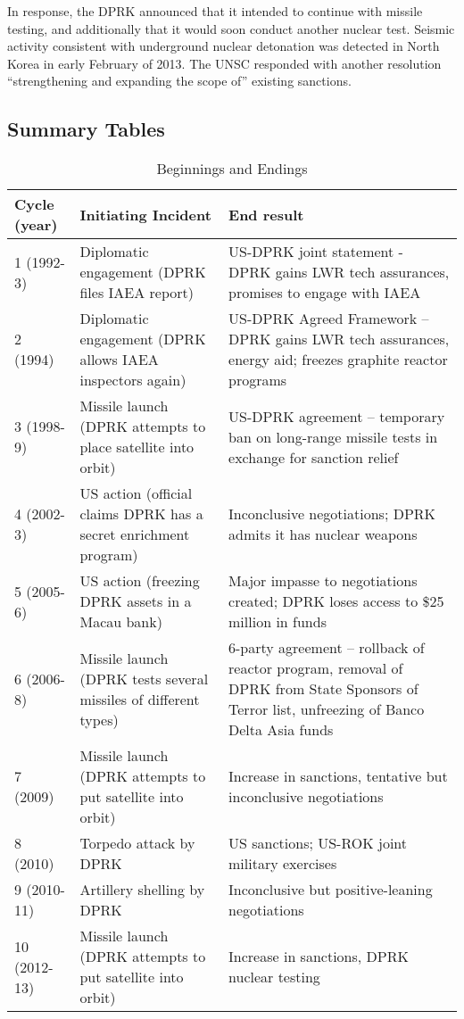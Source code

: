 \documentclass{article}
\begin{document}
In response, the DPRK announced that it intended to continue with missile testing, and additionally that it would soon conduct another nuclear test\cite{davenport}. Seismic activity consistent with underground nuclear detonation was detected in North Korea in early February of 2013\cite{davenport}. The UNSC responded with another resolution “strengthening and expanding the scope of” existing sanctions\cite{unsc13m}.

\subsection{Summary Tables}

\begin{table}[H]
	\caption{Beginnings and Endings}
	\begin{tabular}{|l|p{5cm}|p{5cm}|}
	\hline
	Cycle (year) & Initiating Incident & End result \\ 
	\hline
	1 (1992-3) & Diplomatic engagement (DPRK files IAEA report) & US-DPRK joint statement - DPRK gains LWR tech assurances, promises to engage with IAEA \\ 
	\hline
	2 (1994) & Diplomatic engagement (DPRK allows IAEA inspectors again) & US-DPRK Agreed Framework – DPRK gains LWR tech assurances, energy aid; freezes graphite reactor programs \\ 
	\hline
	3 (1998-9) & Missile launch (DPRK attempts to place satellite into orbit) & US-DPRK agreement – temporary ban on long-range missile tests in exchange for sanction relief \\ 
	\hline
	4 (2002-3) & US action (official claims DPRK has a secret enrichment program) & Inconclusive negotiations; DPRK admits it has nuclear weapons \\ 
	\hline
	5 (2005-6) & US action (freezing DPRK assets in a Macau bank) & Major impasse to negotiations created; DPRK loses access to \$25 million in funds \\ 
	\hline
	6 (2006-8) & Missile launch (DPRK tests several missiles of different types) & 6-party agreement – rollback of reactor program, removal of DPRK from State Sponsors of Terror list, unfreezing of Banco Delta Asia funds \\ 
	\hline
	7 (2009) & Missile launch (DPRK attempts to put satellite into orbit) & Increase in sanctions, tentative but inconclusive negotiations \\ 
	\hline
	8 (2010) & Torpedo attack by DPRK & US sanctions; US-ROK joint military exercises \\ 
	\hline
	9 (2010-11) & Artillery shelling by DPRK & Inconclusive but positive-leaning negotiations \\ 
	\hline
	10 (2012-13) & Missile launch (DPRK attempts to put satellite into orbit) & Increase in sanctions, DPRK nuclear testing \\
	\hline
	\end{tabular}
\end{table}
\end{document}

